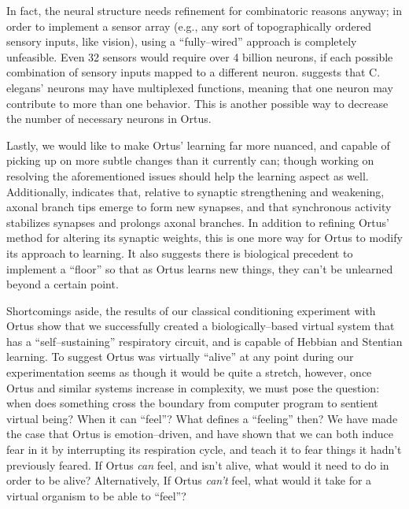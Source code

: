 \documentclass[letterpaper]{article}
\begin{document}
In fact, the neural structure needs refinement for combinatoric reasons anyway; in order to implement a sensor array (e.g., any sort of topographically ordered sensory inputs, like vision), using a ``fully--wired'' approach is completely unfeasible. Even 32 sensors would require over 4 billion neurons, if each possible combination of sensory inputs mapped to a different neuron. \citet{Schroter2017} suggests that C. elegans' neurons may have multiplexed functions, meaning that one neuron may contribute to more than one behavior. This is another possible way to decrease the number of necessary neurons in Ortus.


Lastly, we would like to make Ortus' learning far more nuanced, and capable of picking up on more subtle changes than it currently can; though working on resolving the aforementioned issues should help the learning aspect as well. Additionally, \citet{Kutsarova2016} indicates that, relative to synaptic strengthening and weakening, axonal branch tips emerge to form new synapses, and that synchronous activity stabilizes synapses and prolongs axonal branches. In addition to refining Ortus' method for altering its synaptic weights, this is one more way for Ortus to modify its approach to learning. It also suggests there is biological precedent to implement a ``floor'' so that as Ortus learns new things, they can't be unlearned beyond a certain point. 


Shortcomings aside, the results of our classical conditioning experiment with Ortus show that we successfully created a biologically--based virtual system that has a ``self--sustaining'' respiratory circuit, and is capable of Hebbian and Stentian learning. To suggest Ortus was virtually ``alive'' at any point during our experimentation seems as though it would be quite a stretch, however, once Ortus and similar systems increase in complexity, we must pose the question: when does something cross the boundary from computer program to sentient virtual being? When it can ``feel''? What defines a ``feeling'' then? We have made the case that Ortus is emotion--driven, and have shown that we can both induce fear in it by interrupting its respiration cycle, and teach it to fear things it hadn't previously feared. If Ortus \textit{can} feel, and isn't alive, what would it need to do in order to be alive? Alternatively, If Ortus \textit{can't} feel, what would it take for a virtual organism to be able to ``feel''?
\end{document}
